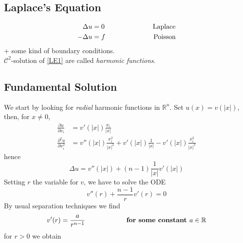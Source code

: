 \subsection{Laplace's Equation}
\begin{align}
    \label{LE1}
    \Delta u&=0 \hspace{2.5 cm} \text{Laplace}\\
    \label{LE2}
    -\Delta u&=f \hspace{2.5 cm} \text{Poisson}
\end{align}
+ some kind of boundary conditions. \\
$\mathcal{C}^2$-solution of \eqref{LE1} are called \emph{harmonic functions}.\\
\subsection{Fundamental Solution}
We start by looking for \emph{radial} harmonic functions in $ \mathbb{R}^n$. Set $u(x)=v(|x|)$, then, for $x \neq 0$, 
\begin{equation*}
    \begin{split}
        \frac{\partial u}{\partial x_i}&= v' (|x|)\frac{x_i}{|x|} \\
        \frac{\partial^2 u}{\partial x_i^2}&= v'' (|x|)\frac{x_i^2}{|x|^2} + v' (|x|)\frac{1}{|x|}-v' (|x|)\frac{x_i^2}{|x|^3}  
    \end{split}
\end{equation*}
hence 
\begin{equation*}
    \Delta u = v''(|x|) +(n-1) \frac{1}{|x|}v'(|x|)
\end{equation*}
Setting $r$ the variable for $v$, we have to solve the ODE
\begin{equation*}
    v''(r)+ \frac{n-1}{r}v'(r)=0
\end{equation*}
By usual separation techniques we find 
\begin{equation*}
    v'(r)= \frac{a}{r^{n-1}}\hspace{2 cm} \textbf{ for some constant } a \in \mathbb{R}
\end{equation*}
for $r>0$ we obtain 

